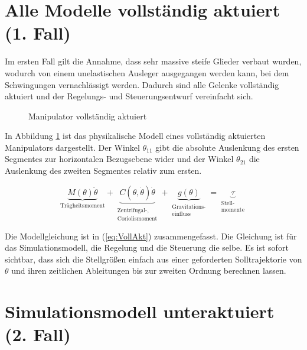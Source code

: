 \section{Alle Modelle vollständig aktuiert (1. Fall)}

Im ersten Fall gilt die Annahme, dass sehr massive steife Glieder verbaut wurden, wodurch von einem unelastischen Ausleger ausgegangen werden kann, bei dem Schwingungen vernachlässigt werden. Dadurch sind alle Gelenke vollständig aktuiert und der Regelungs- und Steuerungsentwurf vereinfacht sich.

\begin{figure}[h]
	\centering
	
	\caption{Manipulator vollständig aktuiert}
	\label{fig:VollAkt}
\end{figure} 

In Abbildung \ref{fig:VollAkt} ist das physikalische Modell eines vollständig aktuierten Manipulators dargestellt. Der Winkel $\theta_{11}$ gibt die absolute Auslenkung des ersten Segmentes zur horizontalen Bezugsebene wider und der Winkel $\theta_{21}$ die Auslenkung des zweiten Segmentes relativ zum ersten.

\begin{equation} \label{eq:VollAkt}
\underbrace{M(\theta)\ddot{\theta}}_{\mbox{Trägheitsmoment}} + \underbrace{C(\theta,\dot{\theta})\dot{\theta}}_{\begin{matrix}
	\mbox{Zentrifugal-,} \\ \mbox{Coriolismoment} \end{matrix}}+\underbrace{g(\theta)}_{\begin{matrix}
	\mbox{Gravitations-} \\ \mbox{einfluss} \end{matrix}}=\underbrace{\tau}_{\begin{matrix}
	\mbox{Stell-} \\ \mbox{momente} \end{matrix}}
\end{equation}

Die Modellgleichung ist in (\ref{eq:VollAkt}) zusammengefasst. Die Gleichung ist für das Simulationsmodell, die Regelung und die Steuerung die selbe. Es ist sofort sichtbar, dass sich die Stellgrößen einfach aus einer geforderten Solltrajektorie von $\theta$ und ihren zeitlichen Ableitungen bis zur zweiten Ordnung berechnen lassen.

\section{Simulationsmodell unteraktuiert (2. Fall)}


